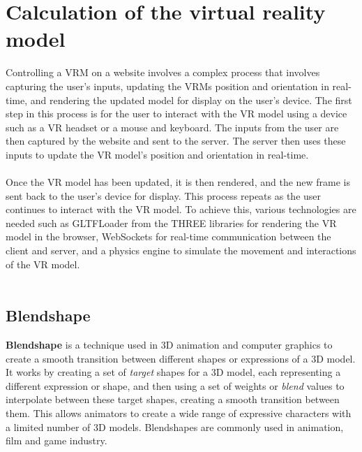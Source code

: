 \section{Calculation of the virtual reality model} 
Controlling a VRM on a website involves a complex process that involves 
capturing the user's inputs, updating the VRMs position and orientation in real-time, 
and rendering the updated model for display on the user's device.
The first step in this process is for the user to interact with the VR model 
using a device such as a VR headset or a mouse and keyboard. The inputs from the 
user are then captured by the website and sent to the server. The server then 
uses these inputs to update the VR model's position and orientation in real-time. 
\\
\\
Once the VR model has been updated, it is then rendered, and the new frame is 
sent back to the user's device for display. This process repeats as the user 
continues to interact with the VR model. 
To achieve this, various technologies are needed such as GLTFLoader\cite{GLTFLoader} from the THREE\cite{threejs}
libraries for rendering the VR model in the browser, WebSockets for real-time 
communication between the client and server, and a physics engine to simulate 
the movement and interactions of the VR model. 
\\
\\
\subsection{Blendshape}
\textbf{Blendshape} is a technique used in 3D animation and computer graphics to create a smooth transition between different shapes or expressions of a 3D model. 
It works by creating a set of \emph{target} shapes for a 3D model, each representing a different expression or shape, 
and then using a set of weights or \emph{blend} values to interpolate between these target shapes, creating a 
smooth transition between them. This allows animators to create a wide range of expressive characters with a 
limited number of 3D models. Blendshapes are commonly used in animation, film and game industry.
\\
\\
